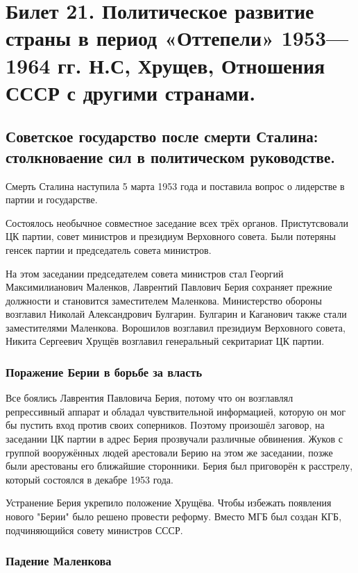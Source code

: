 \section{ Билет 21. Политическое развитие страны в период «Оттепели» 1953—1964 гг. Н.С, Хрущев, Отношения СССР с другими странами.}

\subsection{Советское государство после смерти Сталина: столкноваение сил в политическом руководстве.}

Смерть Сталина наступила 5 марта 1953 года и поставила вопрос о лидерстве в партии и государстве.

Состоялось необычное совместное заседание всех трёх органов. Пристутсвовали ЦК партии, совет министров и президиум Верховного совета. Были потеряны генсек партии и председатель совета министров.

На этом заседании председателем совета министров стал Георгий Максимилианович Маленков, Лаврентий Павлович Берия сохраняет прежние должности и становится заместителем Маленкова. Министерство обороны возглавил Николай Александрович Булгарин. Булгарин и Каганович также стали заместителями Маленкова. Ворошилов возглавил президиум Верховного совета, Никита Сергеевич Хрущёв возглавил генеральный секритариат ЦК партии.

\subsubsection{Поражение Берии в борьбе за власть}

Все боялись Лаврентия Павловича Берия, потому что он возглавлял репрессивный аппарат и обладал чувствительной информацией, которую он мог бы пустить вход против своих соперников. Поэтому произошёл заговор, на заседании ЦК партии в адрес Берия прозвучали различные обвинения. Жуков с группой вооружённых людей арестовали Берию на этом же заседании, позже были арестованы его ближайшие сторонники. Берия был приговорён к расстрелу, который состоялся в декабре 1953 года.

Устранение Берия укрепило положение Хрущёва. Чтобы избежать появления нового "Берии" было решено провести реформу. Вместо МГБ был создан КГБ, подчиняющийся совету министров СССР.

\subsubsection{Падение Маленкова}

